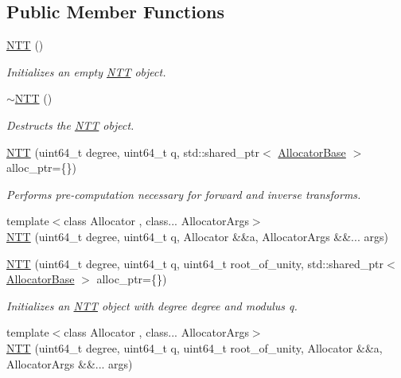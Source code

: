 \subsection*{Public Member Functions}
\begin{DoxyCompactItemize}
\item 
\hyperlink{classintel_1_1hexl_1_1NTT_ade0447617b50232d2a076f99e672d15c}{N\+TT} ()
\begin{DoxyCompactList}\small\item\em Initializes an empty \hyperlink{classintel_1_1hexl_1_1NTT}{N\+TT} object. \end{DoxyCompactList}\item 
\hyperlink{classintel_1_1hexl_1_1NTT_ab6fca1753db0834c692232e8897c725f}{$\sim$\+N\+TT} ()
\begin{DoxyCompactList}\small\item\em Destructs the \hyperlink{classintel_1_1hexl_1_1NTT}{N\+TT} object. \end{DoxyCompactList}\item 
\hyperlink{classintel_1_1hexl_1_1NTT_a7a86355beefbe191d0e77618eeaaf6b7}{N\+TT} (uint64\+\_\+t degree, uint64\+\_\+t q, std\+::shared\+\_\+ptr$<$ \hyperlink{structintel_1_1hexl_1_1AllocatorBase}{Allocator\+Base} $>$ alloc\+\_\+ptr=\{\})
\begin{DoxyCompactList}\small\item\em Performs pre-\/computation necessary for forward and inverse transforms. \end{DoxyCompactList}\item 
{\footnotesize template$<$class Allocator , class... Allocator\+Args$>$ }\\\hyperlink{classintel_1_1hexl_1_1NTT_a716fd07255e9b68fec80e2a9b98841f4}{N\+TT} (uint64\+\_\+t degree, uint64\+\_\+t q, Allocator \&\&a, Allocator\+Args \&\&... args)
\item 
\hyperlink{classintel_1_1hexl_1_1NTT_ac5ef577bf39789c1e200b7d5a7b65989}{N\+TT} (uint64\+\_\+t degree, uint64\+\_\+t q, uint64\+\_\+t root\+\_\+of\+\_\+unity, std\+::shared\+\_\+ptr$<$ \hyperlink{structintel_1_1hexl_1_1AllocatorBase}{Allocator\+Base} $>$ alloc\+\_\+ptr=\{\})
\begin{DoxyCompactList}\small\item\em Initializes an \hyperlink{classintel_1_1hexl_1_1NTT}{N\+TT} object with degree {\ttfamily degree} and modulus {\ttfamily q}. \end{DoxyCompactList}\item 
{\footnotesize template$<$class Allocator , class... Allocator\+Args$>$ }\\\hyperlink{classintel_1_1hexl_1_1NTT_a831df901cf9ea5a83e5d628cdbd36671}{N\+TT} (uint64\+\_\+t degree, uint64\+\_\+t q, uint64\+\_\+t root\+\_\+of\+\_\+unity, Allocator \&\&a, Allocator\+Args \&\&... args)

\end{DoxyCompactItemize}
